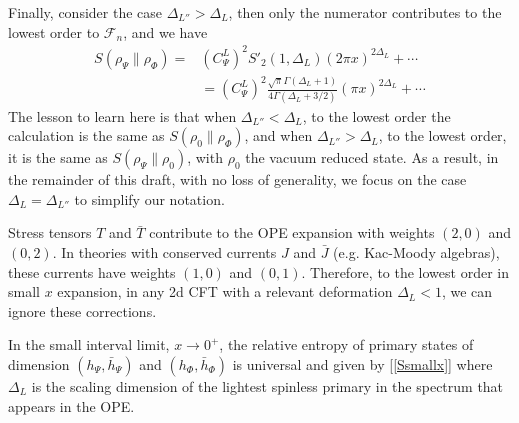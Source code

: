\documentclass[11pt]{article}
\newcommand{\nn}{\nonumber}
\newcommand{\NL}[1]{\textcolor{blue}{#1}}
\newcommand{\JM}[1]{\textcolor{orange}{#1}}
\begin{document}
Finally, consider the case $\Delta_{L''}>\Delta_L$, then only the numerator contributes to the lowest order to $\mathcal{F}_n$, and we have
\begin{align}
S(\rho_\Psi\|\rho_\Phi)
=&
{(C_\Psi^L)}^2 S'_2(1,\Delta_{L})(2\pi x)^{2\Delta_{L}}+\cdots \nn\\
&={(C_\Psi^L)}^2 \frac{\sqrt{\pi}\Gamma(\Delta_{L}+1)}{4\Gamma(\Delta_{L}+3/2)}(\pi x)^{2\Delta_{L}}+\cdots
\end{align}
The lesson to learn here is that when $\Delta_{L''}<\Delta_{L}$, to the lowest order the calculation is the same as $S(\rho_0\|\rho_\Phi)$, and when $\Delta_{L''}>\Delta_L$, to the lowest order, it is the same as $S(\rho_\Psi\|\rho_0)$, with $\rho_0$ the vacuum reduced state. As a result, in the remainder of this draft, with no loss of generality, we focus on the case $\Delta_L=\Delta_{L''}$ to simplify our notation. 

Stress tensors $T$ and $\bar{T}$ contribute to the OPE expansion with weights $(2,0)$ and $(0,2)$. In theories with conserved currents $J$ and $\bar{J}$ (e.g. Kac-Moody algebras), these currents have weights $(1,0)$ and $(0,1)$. Therefore, to the lowest order in small $x$ expansion, in any 2d CFT with a relevant deformation $\Delta_L<1$, we can ignore these corrections. 


  In the small interval limit, $x\to 0^+$, the relative entropy of primary states of dimension 
  $(h_\Psi,\bar{h}_\Psi)$ and $(h_\Phi,\bar{h}_\Phi)$
  is universal and given by [\ref{Ssmallx}]
  where $\Delta_L$ is the scaling dimension of the lightest spinless primary in the spectrum that appears in the OPE.
\end{document}
